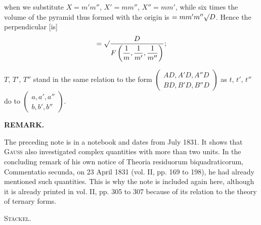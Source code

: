 
\noindent when we substitute $X = m'm''$, $X' = mm''$, $X'' = mm'$, while six times
the volume of the pyramid thus formed with the origin is $= mm'm''\mathord{\surd}D$.
Hence the perpendicular [is]
\[
= \mathord{\surd}\dfrac{D}{F\left(\dfrac{1}{m}, \dfrac{1}{m'}, \dfrac{1}{m''}\right)};
\]

$T$, $T'$, $T''$ stand in the same relation to the form $\begin{pmatrix} AD, A'D, A''D \\ BD, B'D, B''D \end{pmatrix}$
as $t$, $t'$, $t''$ do to $\begin{pmatrix} a, a', a'' \\ b, b', b'' \end{pmatrix}$.



\begin{center}
\bfseries REMARK.
\end{center}

The preceding note is in a notebook and dates from July 1831. It
shows that \textsc{Gauss} also investigated complex quantities with more than two units.
In the concluding remark of his own notice of Theoria residuorum
biquadraticorum, Commentatio secunda, on 23 April 1831 (vol. II, pp. 169 to 198), he had already mentioned such quantities.
This is why the note is included again here, although it is already printed in vol. II, pp. 305 to
307 because of its relation to the theory of ternary forms.
\begin{flushright}
\textsc{Stäckel.}
\end{flushright}



